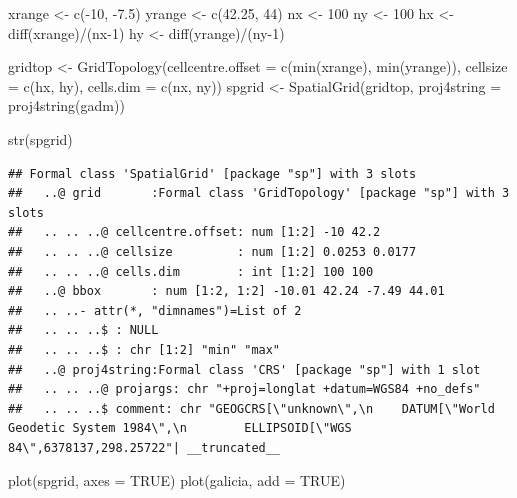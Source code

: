 \documentclass[
  spanish,
]{book}
\newenvironment{Shaded}{\begin{snugshade}}{\end{snugshade}}
\newcommand{\AttributeTok}[1]{\textcolor[rgb]{0.77,0.63,0.00}{#1}}
\newcommand{\ConstantTok}[1]{\textcolor[rgb]{0.00,0.00,0.00}{#1}}
\newcommand{\DecValTok}[1]{\textcolor[rgb]{0.00,0.00,0.81}{#1}}
\newcommand{\FloatTok}[1]{\textcolor[rgb]{0.00,0.00,0.81}{#1}}
\newcommand{\FunctionTok}[1]{\textcolor[rgb]{0.00,0.00,0.00}{#1}}
\newcommand{\NormalTok}[1]{#1}
\newcommand{\OtherTok}[1]{\textcolor[rgb]{0.56,0.35,0.01}{#1}}
\newcommand{\SpecialCharTok}[1]{\textcolor[rgb]{0.00,0.00,0.00}{#1}}
\theoremstyle{break}
\begin{document}
\begin{Shaded}
\begin{Highlighting}[]
\NormalTok{xrange }\OtherTok{\textless{}{-}} \FunctionTok{c}\NormalTok{(}\SpecialCharTok{{-}}\DecValTok{10}\NormalTok{, }\SpecialCharTok{{-}}\FloatTok{7.5}\NormalTok{)}
\NormalTok{yrange }\OtherTok{\textless{}{-}} \FunctionTok{c}\NormalTok{(}\FloatTok{42.25}\NormalTok{, }\DecValTok{44}\NormalTok{)}
\NormalTok{nx }\OtherTok{\textless{}{-}} \DecValTok{100}
\NormalTok{ny }\OtherTok{\textless{}{-}} \DecValTok{100}
\NormalTok{hx }\OtherTok{\textless{}{-}} \FunctionTok{diff}\NormalTok{(xrange)}\SpecialCharTok{/}\NormalTok{(nx}\DecValTok{{-}1}\NormalTok{)}
\NormalTok{hy }\OtherTok{\textless{}{-}} \FunctionTok{diff}\NormalTok{(yrange)}\SpecialCharTok{/}\NormalTok{(ny}\DecValTok{{-}1}\NormalTok{)}

\NormalTok{gridtop }\OtherTok{\textless{}{-}} \FunctionTok{GridTopology}\NormalTok{(}\AttributeTok{cellcentre.offset =} \FunctionTok{c}\NormalTok{(}\FunctionTok{min}\NormalTok{(xrange), }\FunctionTok{min}\NormalTok{(yrange)),}
                        \AttributeTok{cellsize =} \FunctionTok{c}\NormalTok{(hx, hy), }\AttributeTok{cells.dim =} \FunctionTok{c}\NormalTok{(nx, ny))}
\NormalTok{spgrid }\OtherTok{\textless{}{-}}  \FunctionTok{SpatialGrid}\NormalTok{(gridtop, }\AttributeTok{proj4string =} \FunctionTok{proj4string}\NormalTok{(gadm))}

\FunctionTok{str}\NormalTok{(spgrid)}
\end{Highlighting}
\end{Shaded}

\begin{verbatim}
## Formal class 'SpatialGrid' [package "sp"] with 3 slots
##   ..@ grid       :Formal class 'GridTopology' [package "sp"] with 3 slots
##   .. .. ..@ cellcentre.offset: num [1:2] -10 42.2
##   .. .. ..@ cellsize         : num [1:2] 0.0253 0.0177
##   .. .. ..@ cells.dim        : int [1:2] 100 100
##   ..@ bbox       : num [1:2, 1:2] -10.01 42.24 -7.49 44.01
##   .. ..- attr(*, "dimnames")=List of 2
##   .. .. ..$ : NULL
##   .. .. ..$ : chr [1:2] "min" "max"
##   ..@ proj4string:Formal class 'CRS' [package "sp"] with 1 slot
##   .. .. ..@ projargs: chr "+proj=longlat +datum=WGS84 +no_defs"
##   .. .. ..$ comment: chr "GEOGCRS[\"unknown\",\n    DATUM[\"World Geodetic System 1984\",\n        ELLIPSOID[\"WGS 84\",6378137,298.25722"| __truncated__
\end{verbatim}

\begin{Shaded}
\begin{Highlighting}[]
\FunctionTok{plot}\NormalTok{(spgrid, }\AttributeTok{axes =} \ConstantTok{TRUE}\NormalTok{)}
\FunctionTok{plot}\NormalTok{(galicia, }\AttributeTok{add =} \ConstantTok{TRUE}\NormalTok{)}
\end{Highlighting}
\end{Shaded}
\end{document}
